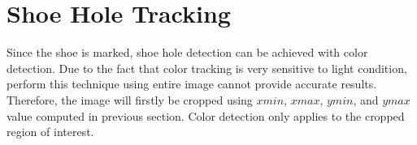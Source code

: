 \section{Shoe Hole Tracking}
Since the shoe is marked, shoe hole detection can be achieved with color detection. Due to the fact that color tracking is very sensitive to light condition, perform this technique using entire image cannot provide accurate results. Therefore, the image will firstly be cropped using $xmin$, $xmax$, $ymin$, and $ymax$ value computed in previous section. Color detection only applies to the cropped region of interest.

\begin{figure}[H]
\centering
{}



\end{figure}

